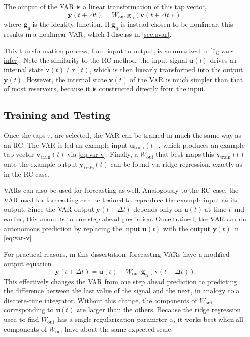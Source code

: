 The output of the VAR is a linear transformation of this tap vector,
\begin{equation}
  \label{eq:var-y}
  \bm{y}(t + \Delta t) = W_\text{out}\;\bm{g}_\text{n}\left(\bm{v}(t + \Delta t)\right),
\end{equation}
where $\bm{g}_\text{n}$ is the identity function. If $\bm{g}_\text{n}$
is instead chosen to be nonlinear, this results in a nonlinear VAR,
which I discuss in \cref{sec:nvar}.

This transformation process, from input to output, is summarized in
\cref{fig:var-infer}. Note the similarity to the RC method: the input
signal $\bm{u}(t)$ drives an internal state $\bm{v}(t)$ / $\bm{r}(t)$,
which is then linearly transformed into the output
$\bm{y}(t)$. However, the internal state $\bm{v}(t)$ of the VAR is
much simpler than that of most reservoirs, because it is constructed
directly from the input.

\subsection{Training and Testing}

Once the taps $\tau_i$ are selected, the VAR can be trained in much
the same way as an RC. The VAR is fed an example input
$\bm{u}_\text{train}(t)$, which produces an example tap vector
$\bm{v}_\text{train}(t)$ via \cref{eq:var-v}. Finally, a $W_\text{out}$
that best maps this $\bm{v}_\text{train}(t)$ onto the example output
$\bm{y}_\text{train}(t)$ can be found via ridge regression, exactly as
in the RC case.

VARs can also be used for forecasting as well. Analogously to the RC
case, the VAR used for forecasting can be trained to reproduce the
example input as its output. Since the VAR output $\bm{y}(t + \Delta
t)$ depends only on $\bm{u}(t)$ at time $t$ and earlier, this amounts
to one step ahead prediction. Once trained, the VAR can do autonomous
prediction by replacing the input $\bm{u}(t)$ with the output
$\bm{y}(t)$ in \cref{eq:var-v}.

For practical reasons, in this dissertation, forecasting VARs have a modified
output equation
\begin{equation}
  \bm{y}(t + \Delta t) = \bm{u}(t) + W_\text{out}\;\bm{g}_\text{n}\left(\bm{v}(t + \Delta t)\right).
\end{equation}
This effectively changes the VAR from one step ahead prediction to
predicting the difference between the last value of the signal and the
next, in analogy to a discrete-time integrator. Without this change,
the components of $W_\text{out}$ corresponding to $\bm{u}(t)$ are
larger than the others. Because the ridge regression used to find
$W_\text{out}$ has a single regularization parameter $\alpha$, it
works best when all components of $W_\text{out}$ have about the same
expected scale.

